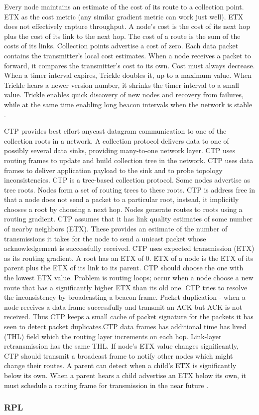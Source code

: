 Every node maintains an estimate of the cost of its route to a collection point. ETX as the cost metric (any similar gradient metric can work just well). ETX does not effectively capture throughput. A node’s cost is the cost of its next hop plus the cost of its link to the next hop. The cost of a route is the sum of the costs of its links. Collection points advertise a cost of zero. Each data packet contains the transmitter’s local cost estimates. When a node receives a packet to forward, it compares the transmitter’s cost to its own. Cost must always decrease. 
When a timer interval expires, Trickle doubles it, up to a maximum value. When Trickle hears a newer version number, it shrinks the timer interval to a small value. Trickle enables quick discovery of new nodes and recovery from failures, while at the same time enabling long beacon intervals when the network is stable \cite{ctp}. 

CTP provides best effort anycast datagram communication to one of the collection roots in a network. A collection protocol delivers data to one of possibly several data sinks, providing many-to-one network layer. CTP uses routing frames to update and build collection tree in the network. CTP uses data frames to deliver application payload to the sink and to probe topology inconsistencies. 
	CTP is a tree-based collection protocol. Some nodes advertise as tree roots. Nodes form a set of routing trees to these roots. CTP is address free in that a node does not send a packet to a particular root, instead, it implicitly chooses a root by choosing a next hop. Nodes generate routes to roots using a routing gradient. CTP assumes that it has link quality estimates of some number of nearby neighbors (ETX). These provides an estimate of the number of transmissions it takes for the node to send a unicast packet whose acknowledgement is successfully received. 
CTP uses expected transmission (ETX) as its routing gradient. A root has an ETX of 0. ETX of a node is the ETX of its parent plus the ETX of its link to its parent. CTP should choose the one with the lowest ETX value. 
Problem is routing loops; occur when a node choose a new route that has a significantly higher ETX than its old one. CTP tries to resolve the inconsistency by broadcasting a beacon frame. Packet duplication - when a node receives a data frame successfully and transmit an ACK but ACK is not received. Thus CTP keeps a small cache of packet signature for the packets it has seen to detect packet duplicates.CTP data frames has additional time has lived (THL) field which the routing layer increments on each hop. Link-layer retransmission has the same THL.
If node’s ETX value changes significantly, CTP should transmit a broadcast frame to notify other nodes which might change their routes. A parent can detect when a child’s ETX is significantly below its own. When a parent hears a child advertise an ETX below its own, it must schedule a routing frame for transmission in the near future \cite{ctptep}.

\subsubsection*{RPL}
